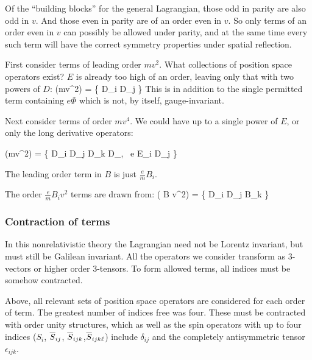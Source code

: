 Of the ``building blocks'' for the general Lagrangian, those odd in parity are also odd in $v$.  And those even in parity are of an order even in $v$.  So only terms of an order even in $v$ can possibly be allowed under parity, and at the same time every such term will have the correct symmetry properties under spatial reflection.

First consider terms of leading order $mv^2$.  What collections of position space operators exist?  $E$ is already too high of an order, leaving only that with two powers of $D$:
\beq
  (mv^2)  = \{  D_i D_j \} 
\eeq
This is in addition to the single permitted term containing $e\Phi$ which is not, by itself, gauge-invariant.
 
 Next consider terms of order $mv^4$.  We could have up to a single power of $E$, or only the long derivative operators:
 
\beq
  (mv^2)  = \{  D_i D_j D_k D_\ell, \,  e E_i D_j \} 
\eeq

The leading order term in $B$ is just $\frac{e}{m}B_i$.

The order $\frac{e}{m} B_i v^2$ terms are drawn from:
\beq
  ( B v^2)  = \{  D_i D_j B_k \}
\eeq


\subsubsection{Contraction of terms}

In this nonrelativistic theory the Lagrangian need not be Lorentz invariant, but must still be Galilean invariant.  All the operators we consider transform as 3-vectors or higher order 3-tensors.  To form allowed terms, all indices must be somehow contracted.

Above, all relevant sets of position space operators are considered for each order of term.  The greatest number of indices free was four.  These must be contracted with order unity structures, which as well as the spin operators with up to four indices ($S_i$, $\overline{S}_{ij}$, $\overline{S}_{ijk}$,$\overline{S}_{ijk\ell}$) include $\delta_{ij}$ and the completely antisymmetric tensor $\epsilon_{ijk}$.

